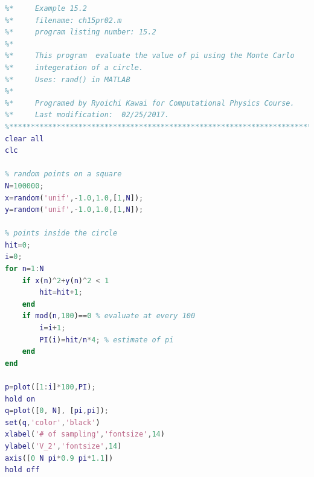 \bigskip
\noindent
\program
\label{prog:vol_sphere}
\footnotesize
\begin{lstlisting}[language=matlab]
%**************************************************************************
%*     Example 15.2                                                       *
%*     filename: ch15pr02.m                                               *
%*     program listing number: 15.2                                       *
%*                                                                        *
%*     This program  evaluate the value of pi using the Monte Carlo       *
%*     integeration of a circle.                                          *
%*     Uses: rand() in MATLAB                                             *
%*                                                                        *
%*     Programed by Ryoichi Kawai for Computational Physics Course.       *
%*     Last modification:  02/25/2017.                                    *
%**************************************************************************
clear all
clc

% random points on a square
N=100000;
x=random('unif',-1.0,1.0,[1,N]);
y=random('unif',-1.0,1.0,[1,N]);

% points inside the circle
hit=0;
i=0;
for n=1:N
    if x(n)^2+y(n)^2 < 1
        hit=hit+1;
    end
    if mod(n,100)==0 % evaluate at every 100 
        i=i+1;
        PI(i)=hit/n*4; % estimate of pi
    end
end

p=plot([1:i]*100,PI);
hold on
q=plot([0, N], [pi,pi]);
set(q,'color','black')
xlabel('# of sampling','fontsize',14)
ylabel('V_2','fontsize',14)
axis([0 N pi*0.9 pi*1.1])
hold off
\end{lstlisting}
\normalsize


